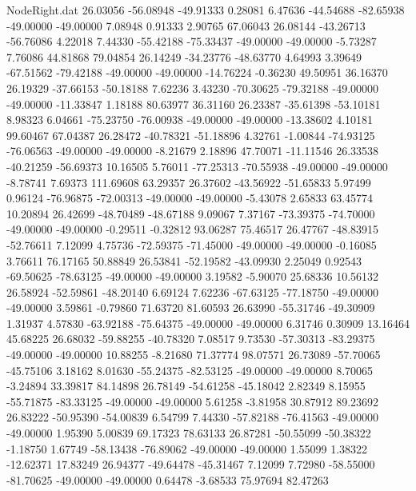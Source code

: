\begin{filecontents}{NodeRight.dat}
  26.03056  -56.08948  -49.91333     0.28081    6.47636  -44.54688  -82.65938  -49.00000  -49.00000    7.08948    0.91333    2.90765   67.06043
  26.08144  -43.26713  -56.76086     4.22018    7.44330  -55.42188  -75.33437  -49.00000  -49.00000   -5.73287    7.76086   44.81868   79.04854
  26.14249  -34.23776  -48.63770     4.64993    3.39649  -67.51562  -79.42188  -49.00000  -49.00000  -14.76224   -0.36230   49.50951   36.16370
  26.19329  -37.66153  -50.18188     7.62236    3.43230  -70.30625  -79.32188  -49.00000  -49.00000  -11.33847    1.18188   80.63977   36.31160
  26.23387  -35.61398  -53.10181     8.98323    6.04661  -75.23750  -76.00938  -49.00000  -49.00000  -13.38602    4.10181   99.60467   67.04387
  26.28472  -40.78321  -51.18896     4.32761   -1.00844  -74.93125  -76.06563  -49.00000  -49.00000   -8.21679    2.18896   47.70071  -11.11546
  26.33538  -40.21259  -56.69373    10.16505    5.76011  -77.25313  -70.55938  -49.00000  -49.00000   -8.78741    7.69373  111.69608   63.29357
  26.37602  -43.56922  -51.65833     5.97499    0.96124  -76.96875  -72.00313  -49.00000  -49.00000   -5.43078    2.65833   63.45774   10.20894
  26.42699  -48.70489  -48.67188     9.09067    7.37167  -73.39375  -74.70000  -49.00000  -49.00000   -0.29511   -0.32812   93.06287   75.46517
  26.47767  -48.83915  -52.76611     7.12099    4.75736  -72.59375  -71.45000  -49.00000  -49.00000   -0.16085    3.76611   76.17165   50.88849
  26.53841  -52.19582  -43.09930     2.25049    0.92543  -69.50625  -78.63125  -49.00000  -49.00000    3.19582   -5.90070   25.68336   10.56132
  26.58924  -52.59861  -48.20140     6.69124    7.62236  -67.63125  -77.18750  -49.00000  -49.00000    3.59861   -0.79860   71.63720   81.60593
  26.63990  -55.31746  -49.30909     1.31937    4.57830  -63.92188  -75.64375  -49.00000  -49.00000    6.31746    0.30909   13.16464   45.68225
  26.68032  -59.88255  -40.78320     7.08517    9.73530  -57.30313  -83.29375  -49.00000  -49.00000   10.88255   -8.21680   71.37774   98.07571
  26.73089  -57.70065  -45.75106     3.18162    8.01630  -55.24375  -82.53125  -49.00000  -49.00000    8.70065   -3.24894   33.39817   84.14898
  26.78149  -54.61258  -45.18042     2.82349    8.15955  -55.71875  -83.33125  -49.00000  -49.00000    5.61258   -3.81958   30.87912   89.23692
  26.83222  -50.95390  -54.00839     6.54799    7.44330  -57.82188  -76.41563  -49.00000  -49.00000    1.95390    5.00839   69.17323   78.63133
  26.87281  -50.55099  -50.38322    -1.18750    1.67749  -58.13438  -76.89062  -49.00000  -49.00000    1.55099    1.38322  -12.62371   17.83249
  26.94377  -49.64478  -45.31467     7.12099    7.72980  -58.55000  -81.70625  -49.00000  -49.00000    0.64478   -3.68533   75.97694   82.47263

\end{filecontents}
